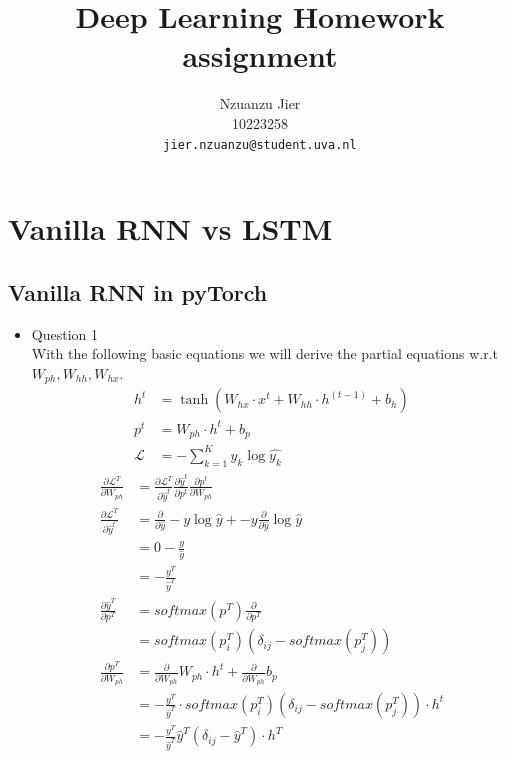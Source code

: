 \documentclass{article}
\title{Deep Learning Homework assignment}
\author{%
  Nzuanzu Jier \\
  10223258 \\
  \texttt{jier.nzuanzu@student.uva.nl} \\
}
\begin{document}

\maketitle


\section{Vanilla RNN vs LSTM }

\subsection{Vanilla RNN in pyTorch}
\begin{itemize}
    \item Question 1 \\
    With the following basic equations we will derive the partial equations w.r.t $W_{ph}, W_{hh}, W_{hx}$.
    \begin{align*}
      h^{t} &= \tanh{\left(W_{hx}\cdot x^{t} + W_{hh}\cdot h^{(t - 1)} + b_h\right)} \\
      p^{t} &= W_{ph}\cdot h^{t} + b_{p} \\
      \mathcal{L} &= - \sum_{k = 1}^{K}  y_k \log{\hat{y_k}}
    \end{align*}
    \begin{align*}
      \frac{\partial \mathcal{L}^T}{\partial W_{ph}} &= \frac{\partial\mathcal{L}^T}{\partial \hat{y}^t} \frac{\partial \hat{y}^t}{\partial p^t} \frac{\partial p^t}{\partial W_{ph}} \\
      \frac{\partial \mathcal{L}^T}{\partial \hat{y}^t} &=  \frac{\partial}{\partial \hat{y}} -y \log{\hat{y}} + -y \frac{\partial}{\partial \hat{y}} \log{\hat{y}} \\
      &= 0 -\frac{y}{\hat{y}} \\
      &= -\frac{y^T}{\hat{y}^T} \\
      \frac{\partial \hat{y}^T}{\partial p^T} &= softmax(p^T) \frac{\partial}{\partial p^T} \\
      &= softmax(p_{i}^{T})\left(\delta_{ij} - softmax(p_{j}^{T})\right)  \\
      \frac{\partial p^T}{\partial W_{ph}} &= \frac{\partial }{\partial W_{ph}} W_{ph} \cdot h^t + \frac{\partial }{\partial W_{ph}} b_p \\
      &= -\frac{y^T}{\hat{y}^T}\cdot softmax(p_{i}^{T})\left(\delta_{ij} - softmax(p_{j}^{T})\right) \cdot h^t \\
      &= -\frac{y^T}{\hat{y}^T} \hat{y}^T \left(\delta_{ij} - \hat{y}^T \right) \cdot h^T \\

\end{align*}
\end{itemize}
\end{document}

